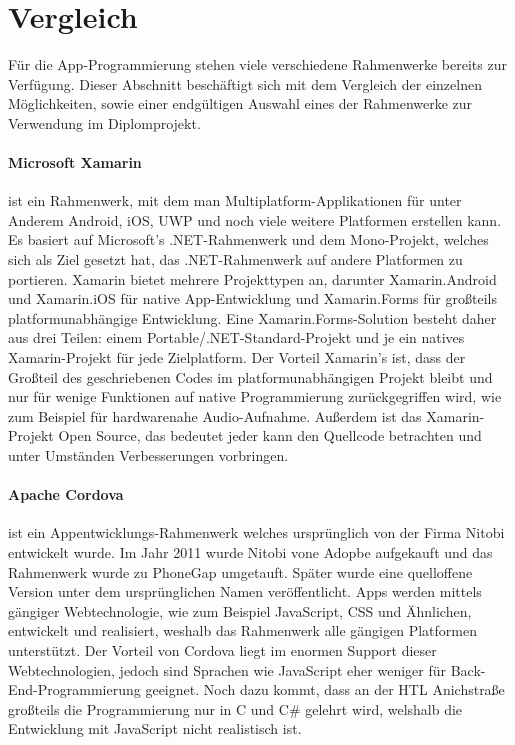\section{Vergleich}
Für die App-Programmierung stehen viele verschiedene Rahmenwerke bereits zur Verfügung.
Dieser Abschnitt beschäftigt sich mit dem Vergleich der einzelnen Möglichkeiten, sowie einer endgültigen Auswahl eines der Rahmenwerke zur Verwendung im Diplomprojekt.

\paragraph{Microsoft Xamarin}
ist ein Rahmenwerk, mit dem man Multiplatform-Applikationen für unter Anderem Android, iOS, UWP und noch viele weitere Platformen erstellen kann.
Es basiert auf Microsoft's .NET-Rahmenwerk und dem Mono-Projekt, welches sich als Ziel gesetzt hat, das .NET-Rahmenwerk auf andere Platformen zu portieren.
Xamarin bietet mehrere Projekttypen an, darunter Xamarin.Android und Xamarin.iOS für native App-Entwicklung und Xamarin.Forms für großteils platformunabhängige Entwicklung.
Eine Xamarin.Forms-Solution besteht daher aus drei Teilen: einem Portable/.NET-Standard-Projekt und je ein natives Xamarin-Projekt für jede Zielplatform.
Der Vorteil Xamarin's ist, dass der Großteil des geschriebenen Codes im platformunabhängigen Projekt bleibt und nur für wenige Funktionen auf native Programmierung zurückgegriffen wird, wie zum Beispiel für hardwarenahe Audio-Aufnahme.
Außerdem ist das Xamarin-Projekt Open Source, das bedeutet jeder kann den Quellcode betrachten und unter Umständen Verbesserungen vorbringen.

\paragraph{Apache Cordova}
ist ein Appentwicklungs-Rahmenwerk welches ursprünglich von der Firma Nitobi entwickelt wurde.
Im Jahr 2011 wurde Nitobi vone Adopbe aufgekauft und das Rahmenwerk wurde zu PhoneGap umgetauft.
Später wurde eine quelloffene Version unter dem ursprünglichen Namen veröffentlicht.
Apps werden mittels gängiger Webtechnologie, wie zum Beispiel JavaScript, CSS und Ähnlichen, entwickelt und realisiert, weshalb das Rahmenwerk alle gängigen Platformen unterstützt.
Der Vorteil von Cordova liegt im enormen Support dieser Webtechnologien, jedoch sind Sprachen wie JavaScript eher weniger für Back-End-Programmierung geeignet.
Noch dazu kommt, dass an der HTL Anichstraße großteils die Programmierung nur in C und C\# gelehrt wird, welshalb die Entwicklung mit JavaScript nicht realistisch ist.

